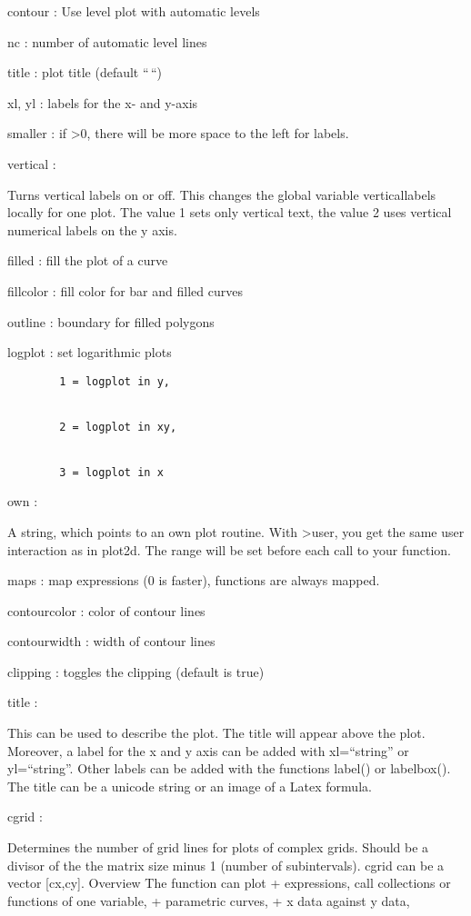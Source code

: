 \documentclass[
]{book}
\begin{document}
contour : Use level plot with automatic levels

nc : number of automatic level lines

title : plot title (default ``\,``)

xl, yl : labels for the x- and y-axis

smaller : if \textgreater0, there will be more space to the left for labels.

vertical :

Turns vertical labels on or off. This changes the global variable verticallabels locally for one plot. The value 1 sets only vertical text, the value 2 uses vertical numerical labels on the y axis.

filled : fill the plot of a curve

fillcolor : fill color for bar and filled curves

outline : boundary for filled polygons

logplot : set logarithmic plots

\begin{verbatim}
        1 = logplot in y,


        2 = logplot in xy,


        3 = logplot in x
\end{verbatim}

own :

A string, which points to an own plot routine. With \textgreater user, you get the same user interaction as in plot2d. The range will be set before each call to your function.

maps : map expressions (0 is faster), functions are always mapped.

contourcolor : color of contour lines

contourwidth : width of contour lines

clipping : toggles the clipping (default is true)

title :

This can be used to describe the plot. The title will appear above the plot. Moreover, a label for the x and y axis can be added with xl=``string'' or yl=``string''. Other labels can be added with the functions label() or labelbox(). The title can be a unicode string or an image of a Latex formula.

cgrid :

Determines the number of grid lines for plots of complex grids. Should be a divisor of the the matrix size minus 1 (number of subintervals). cgrid can be a vector {[}cx,cy{]}. Overview The function can plot + expressions, call collections or functions of one variable, + parametric curves, + x data against y data,
\end{document}

